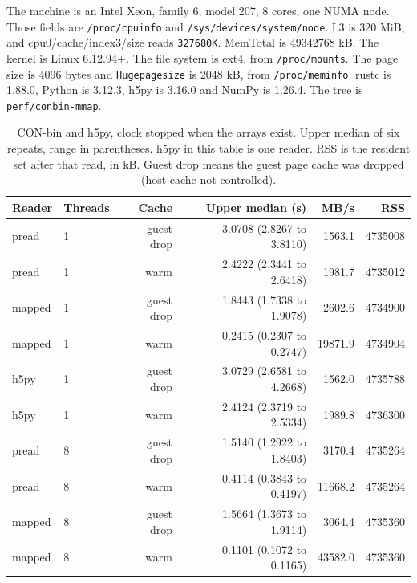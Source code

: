 The machine is an Intel Xeon, family 6, model 207, 8 cores, one NUMA
node.
Those fields are \texttt{/proc/cpuinfo} and
\texttt{/sys/devices/system/node}.
L3 is 320 MiB, and cpu0/cache/index3/size reads \texttt{327680K}.
MemTotal is 49342768 kB.
The kernel is Linux 6.12.94+.
The file system is ext4, from \texttt{/proc/mounts}.
The page size is 4096 bytes and \texttt{Hugepagesize} is 2048 kB, from
\texttt{/proc/meminfo}.
rustc is 1.88.0, Python is 3.12.3, h5py is 3.16.0 and NumPy is 1.26.4.
The tree is \texttt{perf/conbin-mmap}.

\begin{table}[ht] \centering

\caption{CON-bin and h5py, clock stopped when the arrays exist.
Upper median of six repeats, range in parentheses.
h5py in this table is one reader.
RSS is the resident set after that read, in kB.
Guest drop means the guest page cache was dropped (host cache not
controlled).}
\label{tab:conbin-mmap-nosum}
\begin{tabular}{@{}llrrrr@{}}
\toprule
Reader & Threads & Cache & Upper median (s) & MB/s & RSS \\
\midrule
pread & 1 & guest drop & 3.0708 (2.8267 to 3.8110) & 1563.1 & 4735008 \\
pread & 1 & warm & 2.4222 (2.3441 to 2.6418) & 1981.7 & 4735012 \\
mapped & 1 & guest drop & 1.8443 (1.7338 to 1.9078) & 2602.6 & 4734900 \\
mapped & 1 & warm & 0.2415 (0.2307 to 0.2747) & 19871.9 & 4734904 \\
h5py & 1 & guest drop & 3.0729 (2.6581 to 4.2668) & 1562.0 & 4735788 \\
h5py & 1 & warm & 2.4124 (2.3719 to 2.5334) & 1989.8 & 4736300 \\
pread & 8 & guest drop & 1.5140 (1.2922 to 1.8403) & 3170.4 & 4735264 \\
pread & 8 & warm & 0.4114 (0.3843 to 0.4197) & 11668.2 & 4735264 \\
mapped & 8 & guest drop & 1.5664 (1.3673 to 1.9114) & 3064.4 & 4735360 \\
mapped & 8 & warm & 0.1101 (0.1072 to 0.1165) & 43582.0 & 4735360 \\
\bottomrule
\end{tabular}
\end{table}

